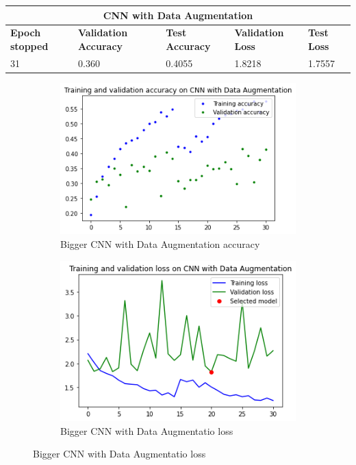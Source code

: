 \begin{tabular}{ |p{2cm}|p{2cm}|p{2cm}|p{2cm}|p{2cm}|  }
\hline
\multicolumn{5}{|c|}{CNN with Data Augmentation} \\
\hline
\textbf{Epoch stopped} & \textbf{Validation Accuracy} & \textbf{Test Accuracy} & \textbf{Validation Loss} & \textbf{Test Loss} \\
\hline
31 & 0.360 & 0.4055 & 1.8218 & 1.7557\\
\hline
\end{tabular}

\medskip


\begin{figure}[H]
	\begin{subfigure}{0.5\textwidth}
		\includegraphics[width=0.9\linewidth]{img/scratch/data_augmentation_acc.png} 
		\caption{Bigger CNN with Data Augmentation accuracy}
		\label{fig:DataAugmentationacc}
	\end{subfigure}
	\begin{subfigure}{0.5\textwidth}
		\includegraphics[width=0.9\linewidth]{img/scratch/data_augmentation_loss.png}
		\caption{Bigger CNN with Data Augmentatio loss}
		\label{fig:DataAugmentationloss}
	\end{subfigure}
\end{figure}

